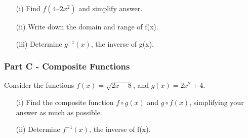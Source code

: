 \documentclass[]{article}
\begin{document}
\begin{itemize}
	\item[(i)]Find $f(4 – 2x^2)$ and simplify answer.
	\item[(ii)] Write down the domain and range of f(x).
	\item[(iii)] Determine $g^{-1}(x)$, the inverse of g(x).
\end{itemize}



\subsubsection*{Part C - Composite Functions}
Consider the functions $f(x) = \sqrt{2x-8}$, and $g(x) = 2x^2 + 4$.
\begin{itemize}
	\item[(i)] Find the composite function $f \circ g(x)$ and $g \circ f(x)$,  simplifying your answer as much as possible.
	\item[(ii)] Determine $f^{-1}(x)$, the inverse of f(x).
\end{itemize}




\newpage











\end{document}
